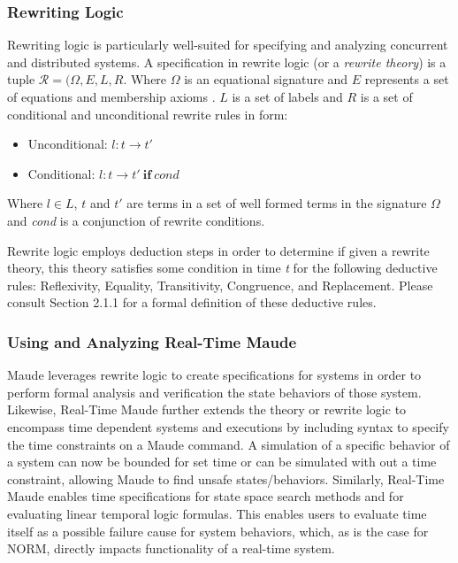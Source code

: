 \documentclass[10pt, journal]{IEEEtran}
\begin{document}
\subsubsection{Rewriting Logic}
Rewriting logic \cite{Meseguer1992} is particularly well-suited for specifying and analyzing concurrent and distributed systems. A specification in rewrite logic (or a \textit{rewrite theory}) is a tuple $\mathcal{R} = (\Omega, \mathit{E}, \mathit{L}, \mathit{R}$. Where $\Omega$ is an equational signature and $\mathit{E}$ represents a set of equations and membership axioms \cite{Lien2004}. $\mathit{L}$ is a set of labels and $\mathit{R}$ is a set of conditional and unconditional rewrite rules in form:
\begin{itemize}
	\item Unconditional: $\mathit{l} : \mathit{t} \rightarrow \mathit{t'}$
	\item Conditional: $\mathit{l} : \mathit{t} \rightarrow \mathit{t'} \: \boldsymbol{if} \: \mathit{cond}$
\end{itemize}

Where $\mathit{l} \in \mathit{L}$, $\mathit{t}$ and $\mathit{t'}$ are terms in a set of well formed terms in the signature $\Omega$ and \textit{cond} is a conjunction of rewrite conditions.

Rewrite logic employs deduction steps in order to determine if given a rewrite theory, this theory satisfies some condition in time \textit{t} for the following deductive rules: Reflexivity, Equality, Transitivity, Congruence, and Replacement. Please consult \cite{Lien2004} Section 2.1.1 for a formal definition of these deductive rules. 

\subsubsection{Using and Analyzing Real-Time Maude}

Maude leverages rewrite logic to create specifications for systems in order to perform formal analysis and verification the state behaviors of those system. Likewise, Real-Time Maude further extends the theory or rewrite logic to encompass time dependent systems and executions by including syntax to specify the time constraints on a Maude command. A simulation of a specific behavior of a system can now be bounded for set time or can be simulated with out a time constraint, allowing Maude to find unsafe states/behaviors. Similarly, Real-Time Maude enables time specifications for state space search methods and for evaluating linear temporal logic formulas. This enables users to evaluate time itself as a possible failure cause for system behaviors, which, as is the case for NORM, directly impacts functionality of a real-time system.
\end{document}
